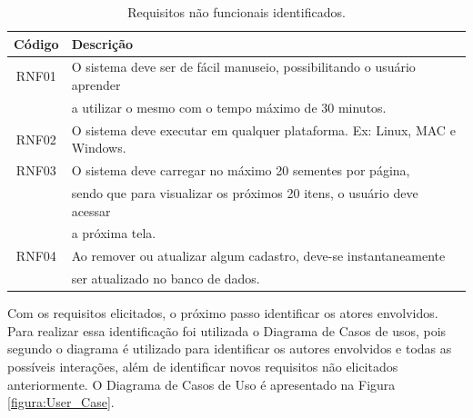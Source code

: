 \documentclass[12pt,a4paper]{article}
\begin{document}
\begin{table}[H]
\centering
\caption{\label{tab:requisitosnaoFuncionalidades}Requisitos não funcionais identificados.}
\begin{tabular}{c|l}

\hline%
Código 	& Descrição 																\\ 
\hline%
RNF01	& O sistema deve ser de fácil manuseio, possibilitando o usuário aprender  	\\ 
		& a utilizar o mesmo com o tempo máximo de 30 minutos. 
\\ 
\hline%
RNF02	& O sistema deve executar em qualquer plataforma. Ex: Linux, MAC e Windows. 				\\ 
\hline%
RNF03	& O sistema deve carregar no máximo 20 sementes por página, \\ 
		&sendo que para visualizar os próximos 20 itens, o usuário deve acessar\\
		&a próxima tela.										\\ 
\hline%
RNF04 	& Ao remover ou atualizar algum cadastro, deve-se instantaneamente 							\\
		&ser atualizado no banco de dados. 										\\ 
\hline%
\end{tabular} 
\end{table} 

Com os requisitos elicitados, o próximo passo identificar os atores envolvidos. Para realizar essa identificação foi utilizada o Diagrama de Casos de usos, pois segundo \cite{sommerville2009} o diagrama é utilizado para identificar os autores envolvidos e todas as possíveis interações, além de identificar novos requisitos não elicitados anteriormente. O Diagrama de Casos de Uso é apresentado na Figura \ref {figura:User_Case}.
\end{document}
